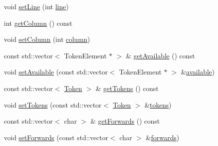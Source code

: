 \begin{DoxyCompactItemize}
\item 
void \mbox{\hyperlink{class_erable_1_1_erable_1_1_compiler_1_1_lexer_a11f71f55d1e61ad7e526e99d7933dc14}{set\+Line}} (int \mbox{\hyperlink{class_erable_1_1_erable_1_1_compiler_1_1_lexer_a4dbc5dd9b944e443de780deee15481a3}{line}})
\item 
int \mbox{\hyperlink{class_erable_1_1_erable_1_1_compiler_1_1_lexer_a098460b39ed659959cdc1a18940c7d84}{get\+Column}} () const
\item 
void \mbox{\hyperlink{class_erable_1_1_erable_1_1_compiler_1_1_lexer_a382ab47c2b4c5c55b8982786c3b29670}{set\+Column}} (int \mbox{\hyperlink{class_erable_1_1_erable_1_1_compiler_1_1_lexer_a5b38024d3191b470cef97de7c8dee02b}{column}})
\item 
const std\+::vector$<$ Token\+Element $\ast$ $>$ \& \mbox{\hyperlink{class_erable_1_1_erable_1_1_compiler_1_1_lexer_a47a2ca91388e01edff0f8a73e0b26452}{get\+Available}} () const
\item 
void \mbox{\hyperlink{class_erable_1_1_erable_1_1_compiler_1_1_lexer_aaf5266285336f1723139f39d1ad49ee2}{set\+Available}} (const std\+::vector$<$ Token\+Element $\ast$ $>$ \&\mbox{\hyperlink{class_erable_1_1_erable_1_1_compiler_1_1_lexer_af87f080c1f23a29f1227a09f39b95f08}{available}})
\item 
const std\+::vector$<$ \mbox{\hyperlink{struct_token}{Token}} $>$ \& \mbox{\hyperlink{class_erable_1_1_erable_1_1_compiler_1_1_lexer_a19397877c2ed5bd875c563b83b8097e8}{get\+Tokens}} () const
\item 
void \mbox{\hyperlink{class_erable_1_1_erable_1_1_compiler_1_1_lexer_a929a206d3178dc2d7aca6d48bed7b231}{set\+Tokens}} (const std\+::vector$<$ \mbox{\hyperlink{struct_token}{Token}} $>$ \&\mbox{\hyperlink{class_erable_1_1_erable_1_1_compiler_1_1_lexer_aa036279dfcbdfae4cfa64541c4993250}{tokens}})
\item 
const std\+::vector$<$ char $>$ \& \mbox{\hyperlink{class_erable_1_1_erable_1_1_compiler_1_1_lexer_a1380413546dc78619677ed5d1fa852e0}{get\+Forwards}} () const
\item 
void \mbox{\hyperlink{class_erable_1_1_erable_1_1_compiler_1_1_lexer_a8bfec979ffbabc4f867881acd25b64ef}{set\+Forwards}} (const std\+::vector$<$ char $>$ \&\mbox{\hyperlink{class_erable_1_1_erable_1_1_compiler_1_1_lexer_a6ea8b70f652331a65c3c953730d1e9c4}{forwards}})
\end{DoxyCompactItemize}
